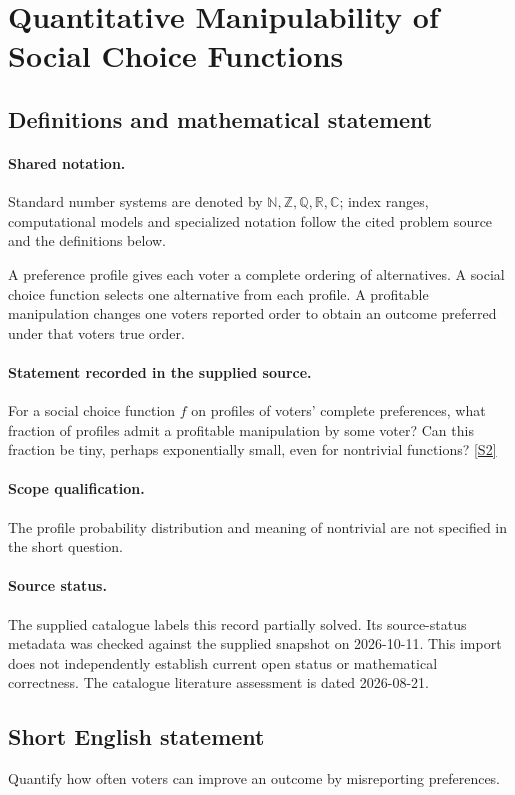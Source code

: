 \documentclass[11pt]{article}
\newcommand{\sref}[2]{\hyperlink{source:#1:#2}{[S#2]}}
\begin{document}
\section{Quantitative Manipulability of Social Choice Functions}\label{statement}

\subsection{Definitions and mathematical statement}

\paragraph{Shared notation.}Standard number systems are denoted by $\mathbb N,\mathbb Z,\mathbb Q,\mathbb R,\mathbb C$; index ranges, computational models and specialized notation follow the cited problem source and the definitions below.


A preference profile gives each voter a complete ordering of alternatives. A social choice function selects one alternative from each profile. A profitable manipulation changes one voter\textquotesingle s reported order to obtain an outcome preferred under that voter\textquotesingle s true order.
\paragraph{Statement recorded in the supplied source.}
For a social choice function $f$ on profiles of voters' complete preferences, what fraction of profiles admit a profitable manipulation by some voter? Can this fraction be tiny, perhaps exponentially small, even for nontrivial functions? \sref{statement}{2}
\paragraph{Scope qualification.}
The profile probability distribution and meaning of nontrivial are not specified in the short question.
\paragraph{Source status.}
The supplied catalogue labels this record partially solved. Its source-status metadata was checked against the supplied snapshot on 2026-10-11. This import does not independently establish current open status or mathematical correctness. The catalogue literature assessment is dated 2026-08-21.
\subsection{Short English statement}
Quantify how often voters can improve an outcome by misreporting preferences.
\end{document}
